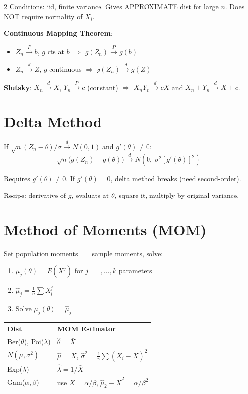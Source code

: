 \documentclass[8pt]{extarticle}
\begin{document}
\begin{multicols}{2}
Conditions: iid, finite variance. Gives APPROXIMATE dist for large $n$. Does NOT require normality of $X_i$.

\textbf{Continuous Mapping Theorem}:
\begin{itemize}
\item $Z_n \xrightarrow{P} b$, $g$ cts at $b$ $\Rightarrow$ $g(Z_n) \xrightarrow{P} g(b)$
\item $Z_n \xrightarrow{d} Z$, $g$ continuous $\Rightarrow$ $g(Z_n) \xrightarrow{d} g(Z)$
\end{itemize}

\textbf{Slutsky}: $X_n \xrightarrow{d} X$, $Y_n \xrightarrow{P} c$ (constant) $\Rightarrow$ $X_nY_n \xrightarrow{d} cX$ and $X_n+Y_n \xrightarrow{d} X+c$.

\section{Delta Method}

If $\sqrt{n}(Z_n - \theta)/\sigma \xrightarrow{d} N(0,1)$ and $g'(\theta) \ne 0$:
$$\sqrt{n}\big(g(Z_n) - g(\theta)\big) \xrightarrow{d} N\!\left(0,\; \sigma^2[g'(\theta)]^2\right)$$

Requires $g'(\theta) \ne 0$. If $g'(\theta)=0$, delta method breaks (need second-order).

Recipe: derivative of $g$, evaluate at $\theta$, square it, multiply by original variance.

\section{Method of Moments (MOM)}

Set population moments $=$ sample moments, solve:
\begin{enumerate}
\item $\mu_j(\theta) = E(X^j)$ for $j = 1,\ldots,k$ parameters
\item $\hat\mu_j = \frac{1}{n}\sum X_i^j$
\item Solve $\mu_j(\theta) = \hat\mu_j$
\end{enumerate}

\begin{tabular}{@{}ll@{}}
\toprule
\textbf{Dist} & \textbf{MOM Estimator} \\
\midrule
Ber($\theta$), Poi($\lambda$) & $\hat\theta = \bar X$ \\
$N(\mu,\sigma^2)$ & $\hat\mu = \bar X$, \; $\hat\sigma^2 = \frac{1}{n}\sum(X_i-\bar X)^2$ \\
Exp($\lambda$) & $\hat\lambda = 1/\bar X$ \\
Gam($\alpha,\beta$) & use $\bar X = \alpha/\beta$, \; $\hat\mu_2 - \bar X^2 = \alpha/\beta^2$ \\
\bottomrule
\end{tabular}


\end{multicols}
\end{document}
